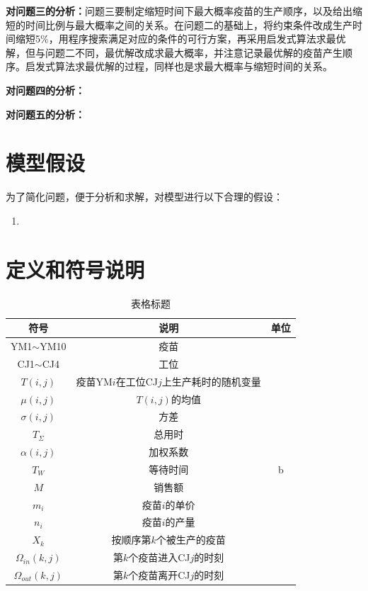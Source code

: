 \documentclass[UTF8]{ctexart}
\begin{document}
	\textbf{对问题三的分析：}问题三要制定缩短时间下最大概率疫苗的生产顺序，以及给出缩短的时间比例与最大概率之间的关系。在问题二的基础上，将约束条件改成生产时间缩短5\%，用程序搜索满足对应的条件的可行方案，再采用启发式算法求最优解，但与问题二不同，最优解改成求最大概率，并注意记录最优解的疫苗产生顺序。启发式算法求最优解的过程，同样也是求最大概率与缩短时间的关系。
	
	\textbf{对问题四的分析：}
	
	
	\textbf{对问题五的分析：}
	
	
	\section{模型假设}
	为了简化问题，便于分析和求解，对模型进行以下合理的假设：
	\begin{enumerate}
		\item
	\end{enumerate}
	
	\section{定义和符号说明}
	\begin{table}[htbp]
		\centering
		\begin{tabular}{ c c c}
			\toprule[2pt]
			符号 & 说明  & 单位 \\
			\hline
			YM1$\sim$YM10 & 疫苗 & \\
			CJ1$\sim$CJ4 &  工位 &\\
			$T(i,j)$&  疫苗YM$i$在工位CJ$j$上生产耗时的随机变量&\\
			$\mu(i,j)$& $T(i,j)$的均值 &\\
			$\sigma(i,j)$ & 方差 &\\
			$T_{\Sigma}$ & 总用时 &\\
			$\alpha(i,j)$ & 加权系数 &\\
			$T_{W}$ & 等待时间 & b\\
			$M$ & 销售额 & \\
			$m_{i}$ & 疫苗$i$的单价 & \\
			$n_{i}$ & 疫苗$i$的产量 & \\
			$X_{k}$& 按顺序第$k$个被生产的疫苗& \\
			$\Omega_{in}(k,j)$& 第$k$个疫苗进入CJ$j$的时刻 & \\
			$\Omega_{out}(k,j)$& 第$k$个疫苗离开CJ$j$的时刻 & \\
			  
			\bottomrule[2pt]
		\end{tabular}\caption{表格标题}\label{p1}
	\end{table}
	
\end{document}
